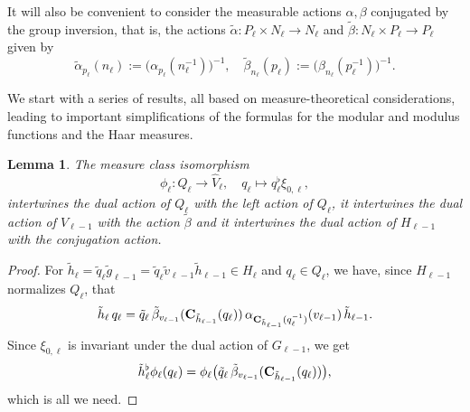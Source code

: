 \documentclass[a4paper,11pt,reqno]{amsart}
\numberwithin{equation}{section}
\newtheorem{lemma}[theorem]{Lemma}
\theoremstyle{remark}
\theoremstyle{definition}
\newcommand\bp{\begin{proof}}
\newcommand\ep{\end{proof}}
\begin{document}
It will also be convenient to consider the measurable actions $\alpha,\beta$ conjugated by the group inversion, that is, the actions $\tilde\alpha :P_\ell\times N_\ell
\to N_\ell$ and $\tilde\beta: N_\ell\times P_\ell\to P_\ell$ given by
$$
\tilde \alpha _{p_\ell}(n_\ell):=\big(\alpha _{p_\ell}(n_\ell^{-1})\big)^{-1},\quad
\tilde\beta_{n_\ell }(p_\ell ):=\big(\beta_{n_\ell }(p_\ell ^{-1})\big)^{-1}.
$$

 We start with a series of results, all based on measure-theoretical considerations, leading to important simplifications
of the formulas for the modular and modulus functions and the Haar measures.
\begin{lemma}
\label{Lphi}
The  measure class  isomorphism
 \begin{equation}
 \label{phi}
\phi_\ell:Q_\ell\to \hat V_\ell, \quad q_\ell\mapsto q_\ell^\flat\xi_{0,\ell},
\end{equation}
intertwines the dual action of $Q_\ell$  with the left action of $Q_\ell$,
it intertwines the dual action of $V_{\ell-1}$ with the action $\tilde\beta$
and it intertwines the dual action of $H_{\ell-1}$ with the conjugation action.
\end{lemma}
\bp
For $\tilde h_\ell=\tilde q_\ell\tilde g_{\ell-1}=\tilde q_\ell\tilde v_{\ell-1}\tilde h_{\ell-1}\in H_\ell$ and $q_\ell\in Q_\ell$, we have,
since $H_{\ell-1}$ normalizes $Q_\ell$, that
$$
\tilde h_\ell \,q_\ell=\tilde q_\ell \,\tilde\beta_{v_{\ell-1}}({\bf C}_{\tilde h_{\ell-1}}(q_\ell))\, \alpha_{{\bf C}_{\tilde h_{\ell-1}}(q_\ell^{-1})}(v_{\ell-1})\,
 \tilde h_{\ell-1}.
$$
Since $\xi_{0,\ell}$ is invariant under the dual action of $G_{\ell-1}$, we get
$$
{\tilde h_\ell} ^\flat\phi_\ell(q_\ell)=\phi_\ell\big(\tilde q_\ell \,\tilde\beta_{v_{\ell-1}}({\bf C}_{\tilde h_{\ell-1}}(q_\ell))\big),
$$
which is all we need.
\ep
\end{document}
